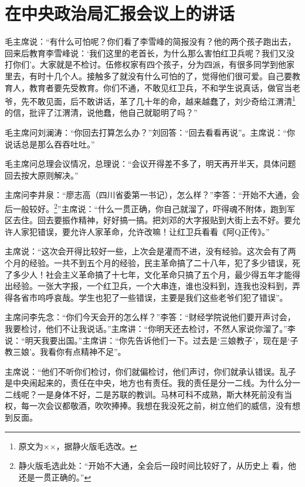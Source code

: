 \section[在中央政治局汇报会议上的讲话（一九六六年十月二十四日）]{在中央政治局汇报会议上的讲话}


毛主席说：“有什么可怕呢？你们看了李雪峰的简报没有？他的两个孩子跑出去，回来后教育李雪峰说：‘我们这里的老首长，为什么那么害怕红卫兵呢？我们又没打你们’。大家就是不检讨。伍修权家有四个孩子，分为四派，有很多同学到他家里去，有时十几个人。接触多了就没有什么可怕的了，觉得他们很可爱。自己要教育人，教育者要先受教育。你们不通，不敢见红卫兵，不和学生说真话，做官当老爷，先不敢见面，后不敢讲话，革了几十年的命，越来越蠢了，刘少奇给江渭清\footnote{原文为××，据静火版毛选改。}的信，批评了江渭清，说他蠢，他自己就聪明了吗？”

毛主席问刘澜涛：“你回去打算怎么办？”刘回答：“回去看看再说”。主席说：“你说话总是那么吞吞吐吐。”

毛主席问总理会议情况，总理说：“会议开得差不多了，明天再开半天，具体问题回去按大原则解决。”

主席问李井泉：“廖志高（四川省委第一书记），怎么样？”李答：“开始不大通，会后一般较好。\footnote{静火版毛选此处：“开始不大通，全会后一段时间比较好了，从历史上
看，他还是一贯正确的。”}”主席说：“什么一贯正确，你自己就溜了，吓得魂不附体，跑到军区去住。回去要振作精神，好好搞一搞。把刘邓的大字报贴到大街上去不好。要允许人家犯错误，要允许人家革命，允许改嘛！让红卫兵看看《阿Q正传》。”

主席说：“这次会开得比较好一些，上次会是灌而不进，没有经验。这次会有了两个月的经验。一共不到五个月的经验，民主革命搞了二十八年，犯了多少错误，死了多少人！社会主义革命搞了十七年，文化革命只搞了五个月，最少得五年才能得出经验。一张大字报，一个红卫兵，一个大串连，谁也没料到，连我也没料到，弄得各省市呜呼哀哉。学生也犯了一些错误，主要是我们这些老爷们犯了错误”。

主席问李先念：“你们今天会开的怎么样？”李答：“财经学院说他们要开声讨会，我要检讨，他们不让我说话。”主席讲：“你明天还去检讨，不然人家说你溜了。”李说：“明天我要出国。”主席讲：“你先告诉他们一下。过去是‘三娘教子’，现在是‘子教三娘’。我看你有点精神不足”。

主席说：“他们不听你们检讨，你们就偏检讨，他们声讨，你们就承认错误。乱子是中央闹起来的，责任在中央，地方也有责任。我的责任是分一二线。为什么分一二线呢？一是身体不好，二是苏联的教训。马林可科不成熟，斯大林死前没有当权，每一次会议都敬酒，吹吹捧捧。我想在我没死之前，树立他们的威信，没有想到反面。

